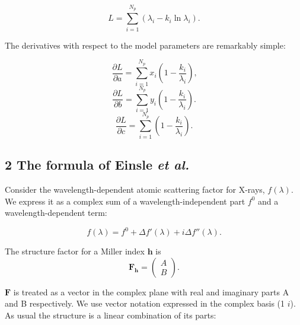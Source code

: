 \documentclass[12pt, letterpaper]{article}
\begin{document}
    \begin{equation}
   L = \sum_{i=1}^{N_p} ( \lambda_i - k_i \ln \lambda_i )
    \text{.}
    \label{eqn:simple}
  \end{equation}
\par The derivatives with respect to the model parameters are remarkably simple:

  \begin{equation}
   \dfrac{\partial L} {\partial a} = 
  \sum_{i=1}^{N_p} x_i (1 - \frac{ k_i}{ \lambda_i } )
    \text{,}
    \label{eqn:grada}
  \end{equation}
  \begin{equation}
   \dfrac{\partial L} {\partial b} = 
  \sum_{i=1}^{N_p} y_i (1 - \frac{ k_i}{ \lambda_i } )
    \text{.}
    \label{eqn:gradb}
  \end{equation}
 \begin{equation}
   \dfrac{\partial L} {\partial c} = 
  \sum_{i=1}^{N_p}  (1 - \frac{ k_i}{ \lambda_i } )
    \text{.}
    \label{eqn:gradb}
  \end{equation}

  \subsection*{2 The formula of Einsle \textit{et al.}}

  \par Consider the wavelength-dependent atomic scattering factor for X-rays, $f(\lambda)$. We 
  express it as a complex sum of a wavelength-independent part $f^0$ and a 
  wavelength-dependent term: 
  
    \begin{equation}
    f (\lambda)=f^0 + \Delta{f}\prime(\lambda) + i\Delta{f''}(\lambda)
    \text{.}
    \label{eqn:part}
  \end{equation}
  
  The structure factor for a Miller index $\mathbf{h}$ is 
     \begin{equation}
    \mathbf{F_h} =\left( \begin{array}{c}
      A \\
      B
    \end{array}\right)
    \text{.}
    \label{eqn:vecF}
  \end{equation}

  $\mathbf{F}$ is treated as a vector in the complex plane with real and imaginary parts A and B respectively.  We use
  vector notation expressed in the complex basis (1 $i$). As usual the structure is a linear combination of its parts:
  
\end{document}
